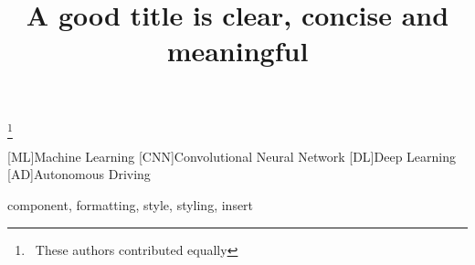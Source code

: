 \documentclass[conference]{IEEEtran}
\newcommand\nnfootnote[1]{  %
  \begin{NoHyper}
  \renewcommand\thefootnote{}\footnote{#1}%
  \addtocounter{footnote}{-1}%
  \end{NoHyper}
}
\begin{document}

\title{A good title is clear, concise and meaningful}


\author{

}

\maketitle

\nnfootnote{\textasteriskcentered~These authors contributed equally}


\begin{acronym}
    [ML]{Machine Learning}
	[CNN]{Convolutional Neural Network}
	[DL]{Deep Learning}
	[AD]{Autonomous Driving}
\end{acronym}



\begin{abstract}

\end{abstract}


\begin{IEEEkeywords}
component, formatting, style, styling, insert
\end{IEEEkeywords}










{\small


}
\end{document}
